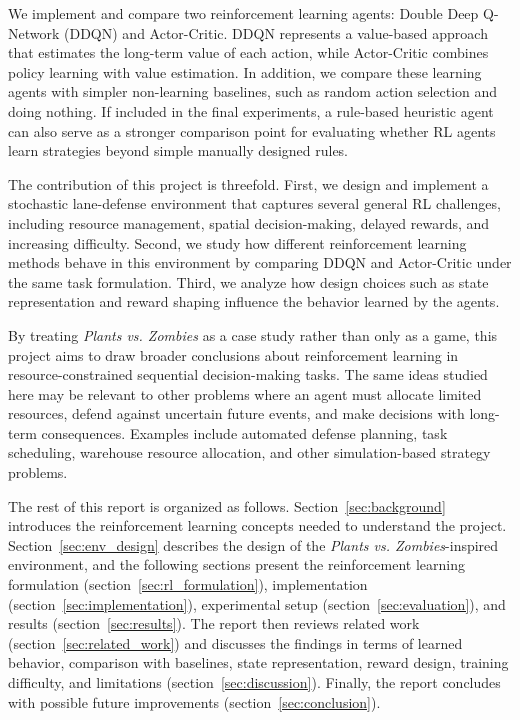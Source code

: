 \documentclass[conference,onecolumn]{IEEEtran}
\begin{document}
We implement and compare two reinforcement learning agents: Double Deep Q-Network (DDQN) and Actor-Critic. DDQN represents a value-based approach that estimates the long-term value of each action, while Actor-Critic combines policy learning with value estimation. In addition, we compare these learning agents with simpler non-learning baselines, such as random action selection and doing nothing. If included in the final experiments, a rule-based heuristic agent can also serve as a stronger comparison point for evaluating whether RL agents learn strategies beyond simple manually designed rules.

The contribution of this project is threefold. First, we design and implement a stochastic lane-defense environment that captures several general RL challenges, including resource management, spatial decision-making, delayed rewards, and increasing difficulty. Second, we study how different reinforcement learning methods behave in this environment by comparing DDQN and Actor-Critic under the same task formulation. Third, we analyze how design choices such as state representation and reward shaping influence the behavior learned by the agents.

By treating \textit{Plants vs. Zombies} as a case study rather than only as a game, this project aims to draw broader conclusions about reinforcement learning in resource-constrained sequential decision-making tasks. The same ideas studied here may be relevant to other problems where an agent must allocate limited resources, defend against uncertain future events, and make decisions with long-term consequences. Examples include automated defense planning, task scheduling, warehouse resource allocation, and other simulation-based strategy problems.

The rest of this report is organized as follows. Section~\ref{sec:background} introduces the reinforcement learning concepts needed to understand the project. Section~\ref{sec:env_design} describes the design of the \textit{Plants vs. Zombies}-inspired environment, and the following sections present the reinforcement learning formulation (section~\ref{sec:rl_formulation}), implementation (section~\ref{sec:implementation}), experimental setup (section~\ref{sec:evaluation}), and results (section~\ref{sec:results}). The report then reviews related work (section~\ref{sec:related_work}) and discusses the findings in terms of learned behavior, comparison with baselines, state representation, reward design, training difficulty, and limitations (section~\ref{sec:discussion}). Finally, the report concludes with possible future improvements (section~\ref{sec:conclusion}).
\end{document}
